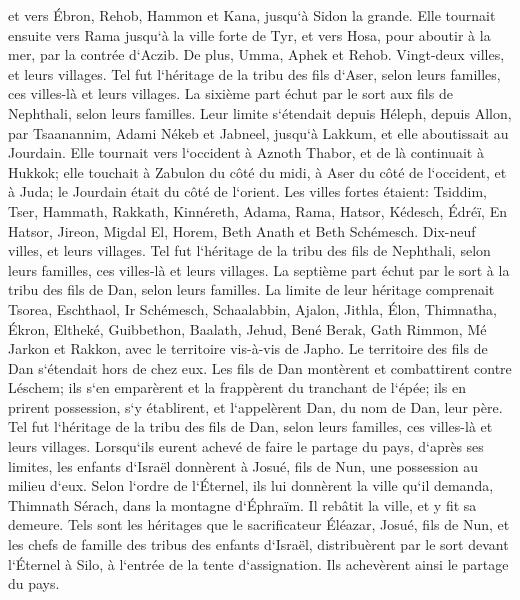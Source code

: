 \verse et vers Ébron, Rehob, Hammon et Kana, jusqu`à Sidon la grande. 
\verse Elle tournait ensuite vers Rama jusqu`à la ville forte de Tyr, et vers Hosa, pour aboutir à la mer, par la contrée d`Aczib. 
\verse De plus, Umma, Aphek et Rehob. Vingt-deux villes, et leurs villages. 
\verse Tel fut l`héritage de la tribu des fils d`Aser, selon leurs familles, ces villes-là et leurs villages. 
\verse La sixième part échut par le sort aux fils de Nephthali, selon leurs familles. 
\verse Leur limite s`étendait depuis Héleph, depuis Allon, par Tsaanannim, Adami Nékeb et Jabneel, jusqu`à Lakkum, et elle aboutissait au Jourdain. 
\verse Elle tournait vers l`occident à Aznoth Thabor, et de là continuait à Hukkok; elle touchait à Zabulon du côté du midi, à Aser du côté de l`occident, et à Juda; le Jourdain était du côté de l`orient. 
\verse Les villes fortes étaient: Tsiddim, Tser, Hammath, Rakkath, Kinnéreth, 
\verse Adama, Rama, Hatsor, 
\verse Kédesch, Édréï, En Hatsor, 
\verse Jireon, Migdal El, Horem, Beth Anath et Beth Schémesch. Dix-neuf villes, et leurs villages. 
\verse Tel fut l`héritage de la tribu des fils de Nephthali, selon leurs familles, ces villes-là et leurs villages. 
\verse La septième part échut par le sort à la tribu des fils de Dan, selon leurs familles. 
\verse La limite de leur héritage comprenait Tsorea, Eschthaol, Ir Schémesch, 
\verse Schaalabbin, Ajalon, Jithla, 
\verse Élon, Thimnatha, Ékron, 
\verse Eltheké, Guibbethon, Baalath, 
\verse Jehud, Bené Berak, Gath Rimmon, 
\verse Mé Jarkon et Rakkon, avec le territoire vis-à-vis de Japho. 
\verse Le territoire des fils de Dan s`étendait hors de chez eux. Les fils de Dan montèrent et combattirent contre Léschem; ils s`en emparèrent et la frappèrent du tranchant de l`épée; ils en prirent possession, s`y établirent, et l`appelèrent Dan, du nom de Dan, leur père. 
\verse Tel fut l`héritage de la tribu des fils de Dan, selon leurs familles, ces villes-là et leurs villages. 
\verse Lorsqu`ils eurent achevé de faire le partage du pays, d`après ses limites, les enfants d`Israël donnèrent à Josué, fils de Nun, une possession au milieu d`eux. 
\verse Selon l`ordre de l`Éternel, ils lui donnèrent la ville qu`il demanda, Thimnath Sérach, dans la montagne d`Éphraïm. Il rebâtit la ville, et y fit sa demeure. 
\verse Tels sont les héritages que le sacrificateur Éléazar, Josué, fils de Nun, et les chefs de famille des tribus des enfants d`Israël, distribuèrent par le sort devant l`Éternel à Silo, à l`entrée de la tente d`assignation. Ils achevèrent ainsi le partage du pays. 

